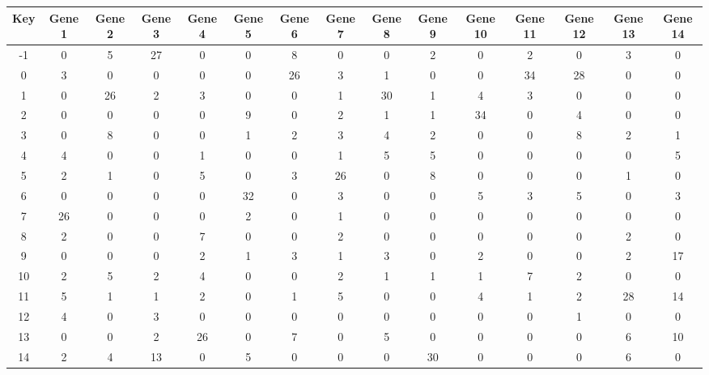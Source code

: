 \begin{tabular}{|c|c|c|c|c|c|c|c|c|c|c|c|c|c|c|}
\hline
Key & Gene 1 & Gene 2 & Gene 3 & Gene 4 & Gene 5 & Gene 6 & Gene 7 & Gene 8 & Gene 9 & Gene 10 & Gene 11 & Gene 12 & Gene 13 & Gene 14 \\
\hline
-1 & 0 & 5 & 27 & 0 & 0 & 8 & 0 & 0 & 2 & 0 & 2 & 0 & 3 & 0 \\
0 & 3 & 0 & 0 & 0 & 0 & 26 & 3 & 1 & 0 & 0 & 34 & 28 & 0 & 0 \\
1 & 0 & 26 & 2 & 3 & 0 & 0 & 1 & 30 & 1 & 4 & 3 & 0 & 0 & 0 \\
2 & 0 & 0 & 0 & 0 & 9 & 0 & 2 & 1 & 1 & 34 & 0 & 4 & 0 & 0 \\
3 & 0 & 8 & 0 & 0 & 1 & 2 & 3 & 4 & 2 & 0 & 0 & 8 & 2 & 1 \\
4 & 4 & 0 & 0 & 1 & 0 & 0 & 1 & 5 & 5 & 0 & 0 & 0 & 0 & 5 \\
5 & 2 & 1 & 0 & 5 & 0 & 3 & 26 & 0 & 8 & 0 & 0 & 0 & 1 & 0 \\
6 & 0 & 0 & 0 & 0 & 32 & 0 & 3 & 0 & 0 & 5 & 3 & 5 & 0 & 3 \\
7 & 26 & 0 & 0 & 0 & 2 & 0 & 1 & 0 & 0 & 0 & 0 & 0 & 0 & 0 \\
8 & 2 & 0 & 0 & 7 & 0 & 0 & 2 & 0 & 0 & 0 & 0 & 0 & 2 & 0 \\
9 & 0 & 0 & 0 & 2 & 1 & 3 & 1 & 3 & 0 & 2 & 0 & 0 & 2 & 17 \\
10 & 2 & 5 & 2 & 4 & 0 & 0 & 2 & 1 & 1 & 1 & 7 & 2 & 0 & 0 \\
11 & 5 & 1 & 1 & 2 & 0 & 1 & 5 & 0 & 0 & 4 & 1 & 2 & 28 & 14 \\
12 & 4 & 0 & 3 & 0 & 0 & 0 & 0 & 0 & 0 & 0 & 0 & 1 & 0 & 0 \\
13 & 0 & 0 & 2 & 26 & 0 & 7 & 0 & 5 & 0 & 0 & 0 & 0 & 6 & 10 \\
14 & 2 & 4 & 13 & 0 & 5 & 0 & 0 & 0 & 30 & 0 & 0 & 0 & 6 & 0 \\
\hline
\end{tabular}